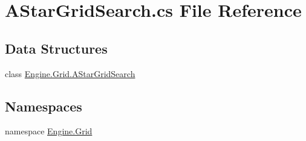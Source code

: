 \hypertarget{a00080}{}\section{A\+Star\+Grid\+Search.\+cs File Reference}
\label{a00080}
\subsection*{Data Structures}
\begin{DoxyCompactItemize}
\item 
class \hyperlink{a00398}{Engine.\+Grid.\+A\+Star\+Grid\+Search}
\end{DoxyCompactItemize}
\subsection*{Namespaces}
\begin{DoxyCompactItemize}
\item 
namespace \hyperlink{a00251}{Engine.\+Grid}
\end{DoxyCompactItemize}
